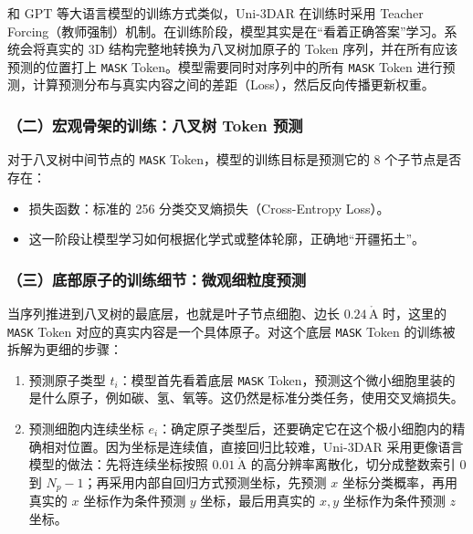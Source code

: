 和 GPT 等大语言模型的训练方式类似，Uni-3DAR 在训练时采用 Teacher Forcing（教师强制）机制。在训练阶段，模型其实是在``看着正确答案''学习。系统会将真实的 3D 结构完整地转换为八叉树加原子的 Token 序列，并在所有应该预测的位置打上 \texttt{MASK} Token。模型需要同时对序列中的所有 \texttt{MASK} Token 进行预测，计算预测分布与真实内容之间的差距（Loss），然后反向传播更新权重。

\hypertarget{ux4e8cux5b8fux89c2ux9aa8ux67b6ux7684ux8badux7ec3ux516bux53c9ux6811-token-ux9884ux6d4b}{%
\subsubsection{（二）宏观骨架的训练：八叉树 Token 预测}\label{ux4e8cux5b8fux89c2ux9aa8ux67b6ux7684ux8badux7ec3ux516bux53c9ux6811-token-ux9884ux6d4b}}

对于八叉树中间节点的 \texttt{MASK} Token，模型的训练目标是预测它的 8 个子节点是否存在：

\begin{itemize}
\tightlist
\item
  损失函数：标准的 256 分类交叉熵损失（Cross-Entropy Loss）。
\item
  这一阶段让模型学习如何根据化学式或整体轮廓，正确地``开疆拓土''。
\end{itemize}

\hypertarget{ux4e09ux5e95ux90e8ux539fux5b50ux7684ux8badux7ec3ux7ec6ux8282ux5faeux89c2ux7ec6ux7c92ux5ea6ux9884ux6d4b}{%
\subsubsection{（三）底部原子的训练细节：微观细粒度预测}\label{ux4e09ux5e95ux90e8ux539fux5b50ux7684ux8badux7ec3ux7ec6ux8282ux5faeux89c2ux7ec6ux7c92ux5ea6ux9884ux6d4b}}

当序列推进到八叉树的最底层，也就是叶子节点细胞、边长 \(0.24\,\mathrm{\mathring{A}}\) 时，这里的 \texttt{MASK} Token 对应的真实内容是一个具体原子。对这个底层 \texttt{MASK} Token 的训练被拆解为更细的步骤：

\begin{enumerate}
\def\labelenumi{\arabic{enumi}.}
\tightlist
\item
  预测原子类型 \(t_i\)：模型首先看着底层 \texttt{MASK} Token，预测这个微小细胞里装的是什么原子，例如碳、氢、氧等。这仍然是标准分类任务，使用交叉熵损失。
\item
  预测细胞内连续坐标 \(e_i\)：确定原子类型后，还要确定它在这个极小细胞内的精确相对位置。因为坐标是连续值，直接回归比较难，Uni-3DAR 采用更像语言模型的做法：先将连续坐标按照 \(0.01\,\mathrm{\mathring{A}}\) 的高分辨率离散化，切分成整数索引 \(0\) 到 \(N_p-1\)；再采用内部自回归方式预测坐标，先预测 \(x\) 坐标分类概率，再用真实的 \(x\) 坐标作为条件预测 \(y\) 坐标，最后用真实的 \(x,y\) 坐标作为条件预测 \(z\) 坐标。
\end{enumerate}

